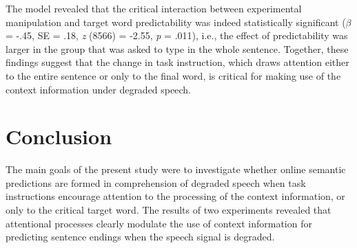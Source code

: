 \documentclass[a4paper, nobind]{templates/ociamthesis}
\begin{document}
The model revealed that the critical interaction between experimental manipulation and target word predictability was indeed statistically significant (\(\beta\) = -.45, SE = .18, \emph{z} (8566) = -2.55, \emph{p} = .011), i.e., the effect of predictability was larger in the group that was asked to type in the whole sentence.
Together, these findings suggest that the change in task instruction, which draws attention either to the entire sentence or only to the final word, is critical for making use of the context information under degraded speech.

\hypertarget{conclusion}{%
\section{Conclusion}\label{conclusion}}

The main goals of the present study were to investigate whether online semantic predictions are formed in comprehension of degraded speech when task instructions encourage attention to the processing of the context information, or only to the critical target word.
The results of two experiments revealed that attentional processes clearly modulate the use of context information for predicting sentence endings when the speech signal is degraded.
\end{document}
